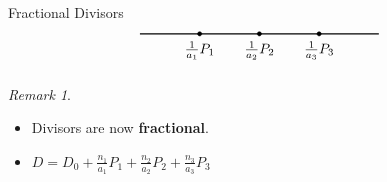 \documentclass{beamer}
\theoremstyle{remark}
\newtheorem{rem}[thm]{Remark}
\newcommand\BQ{{\mathbb Q}}
\newcommand \sx{{\mathscr X}}
\DeclareMathOperator\di{Div}
\begin{document}

\begin{frame}{Fractional Divisors}
\begin{equation} \label{pic:M-curve} \notag
  \begin{tikzpicture}
    \draw[thick] (-3,0) -- (3,0);
		
		
		\filldraw[draw=black,fill=black] (-1.5,0) node [below=2pt]{$\frac{1}{a_1}P_1$} circle (1.5pt);
		\filldraw[draw=black,fill=black] (0,0) node [below=2pt] {$\frac{1}{a_2}P_2$} circle (1.5pt);
		\filldraw[draw=black,fill=black] (1.5,0) node [below=2pt] {$\frac{1}{a_3}P_3$} circle (1.5pt);
		
  \end{tikzpicture}
\end{equation}

\begin{rem}
  \begin{itemize}
  \item Divisors are now \textbf{fractional}.
  \item $D = D_0 + \frac{n_{1}}{a_1}P_1 + \frac{n_{2}}{a_2}P_2 + \frac{n_{3}}{a_3}P_{3}$
  \end{itemize}
\end{rem}

\end{frame}

\end{document}

